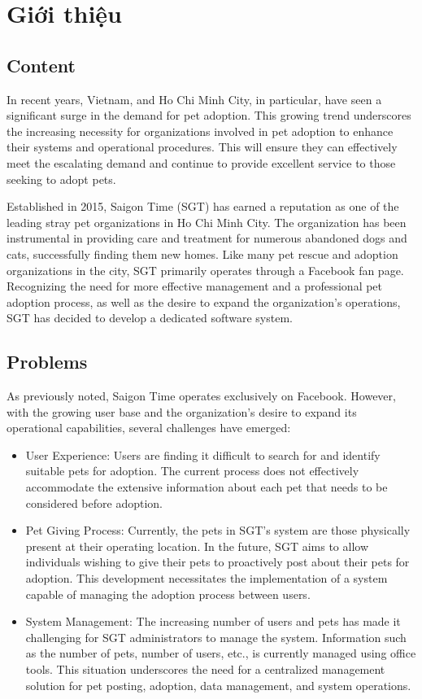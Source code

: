 
\chapter{Giới thiệu}
\section{Content}
In recent years, Vietnam, and Ho Chi Minh City, in particular, have seen a significant surge in the demand for pet adoption. This growing trend underscores the increasing necessity for organizations involved in pet adoption to enhance their systems and operational procedures. This will ensure they can effectively meet the escalating demand and continue to provide excellent service to those seeking to adopt pets.

Established in 2015, Saigon Time (SGT) has earned a reputation as one of the leading stray pet organizations in Ho Chi Minh City. The organization has been instrumental in providing care and treatment for numerous abandoned dogs and cats, successfully finding them new homes. Like many pet rescue and adoption organizations in the city, SGT primarily operates through a Facebook fan page. Recognizing the need for more effective management and a professional pet adoption process, as well as the desire to expand the organization’s operations, SGT has decided to develop a dedicated software system.

\section{Problems}

As previously noted, Saigon Time operates exclusively on Facebook. However, with the growing user base and the organization’s desire to expand its operational capabilities, several challenges have emerged:
\begin{itemize}
    \item User Experience: Users are finding it difficult to search for and identify suitable pets for adoption. The current process does not effectively accommodate the extensive information about each pet that needs to be considered before adoption.
    \item Pet Giving Process: Currently, the pets in SGT’s system are those physically present at their operating location. In the future, SGT aims to allow individuals wishing to give their pets to proactively post about their pets for adoption. This development necessitates the implementation of a system capable of managing the adoption process between users.
    \item System Management: The increasing number of users and pets has made it challenging for SGT administrators to manage the system. Information such as the number of pets, number of users, etc., is currently managed using office tools. This situation underscores the need for a centralized management solution for pet posting, adoption, data management, and system operations.
\end{itemize}

